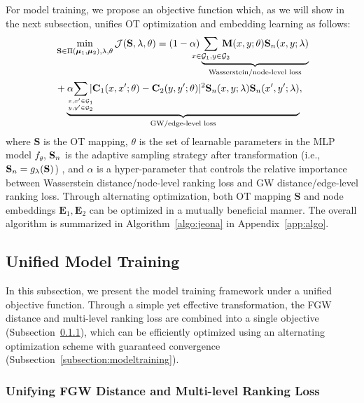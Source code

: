 For model training, we propose an objective function which, as we will show in the next subsection, unifies OT optimization and embedding learning as follows:
\begin{equation}\label{eq:object}
    \begin{aligned}
        &\mathop{\min}\limits_{\mathbf{S}\in\Pi(\bm{\mu}_1,\bm{\mu}_2), \lambda,\theta}\mathcal{J}(\mathbf{S,\lambda,\theta})=(1-\alpha)\underbrace{\!\!\!\!\!\!\sum_{x\in\G_1, y\in\G_2}\!\!\!\!\!\!\mathbf{M}(x,y;\theta)\sn(x,y;\lambda)}_{\text{Wasserstein/node-level loss}}\\
        &+ \alpha \!\!\!\!\!\underbrace{\sum_{x,x'\in\G_1\atop y,y'\in\G_2}\!\!\!\!|\mathbf{C}_1(x,x';\theta)-\mathbf{C}_2(y,y';\theta)|^2\sn(x,y;\lambda)\sn(x',y';\lambda)}_{\text{GW/edge-level loss}},
    \end{aligned}
\end{equation}
\vspace{-2pt}
where $\mathbf{S}$ is the OT mapping, $\theta$ is the set of learnable parameters in the MLP model $f_\theta$, $\mathbf{S}_n$ is the adaptive sampling strategy after transformation (i.e., $\mathbf{S}_n=g_\lambda(\mathbf{S})$) , and $\alpha$ is a hyper-parameter that controls the relative importance between Wasserstein distance/node-level ranking loss and GW distance/edge-level ranking loss. Through alternating optimization, both OT mapping $\mathbf{S}$ and node embeddings $\mathbf{E}_1,\mathbf{E}_2$ can be optimized in a mutually beneficial manner. The overall algorithm is summarized in Algorithm~\ref{algo:jeona} in Appendix~\ref{app:algo}.

\vspace{-2pt}
\subsection{Unified Model Training}\label{subsec:train}
In this subsection, we present the model training framework under a unified objective function. Through a simple yet effective transformation, the FGW distance and multi-level ranking loss are combined into a single objective (Subsection~\ref{subsection:unifyingloss}), which can be efficiently optimized using an alternating optimization scheme with guaranteed convergence (Subsection~\ref{subsection:modeltraining}).

\vspace{-2pt}
\subsubsection{Unifying FGW Distance and Multi-level Ranking Loss}\label{subsection:unifyingloss}

